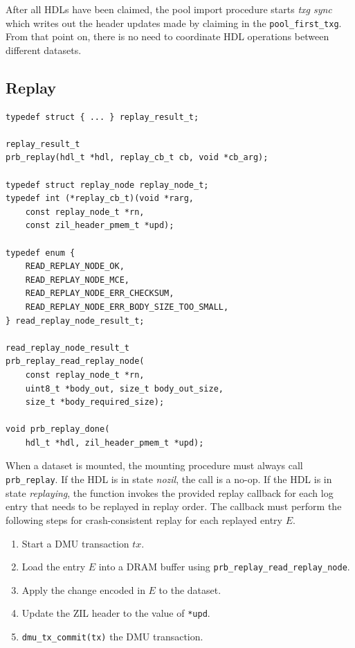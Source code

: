 \documentclass[12pt,a4paper,twoside]{book}
\begin{document}
{After all HDLs have been claimed, the pool import procedure starts \textit{txg sync} which writes out the header updates made by claiming in the \lstinline{pool_first_txg}.
From that point on, there is no need to coordinate HDL operations between different datasets.


\subsection{Replay}\label{di:prb:api:replay}

\begin{lstlisting}
typedef struct { ... } replay_result_t;

replay_result_t
prb_replay(hdl_t *hdl, replay_cb_t cb, void *cb_arg);

typedef struct replay_node replay_node_t;
typedef int (*replay_cb_t)(void *rarg,
    const replay_node_t *rn,
    const zil_header_pmem_t *upd);

typedef enum {
	READ_REPLAY_NODE_OK,
	READ_REPLAY_NODE_MCE,
	READ_REPLAY_NODE_ERR_CHECKSUM,
	READ_REPLAY_NODE_ERR_BODY_SIZE_TOO_SMALL,
} read_replay_node_result_t;

read_replay_node_result_t
prb_replay_read_replay_node(
    const replay_node_t *rn,
    uint8_t *body_out, size_t body_out_size,
    size_t *body_required_size);

void prb_replay_done(
    hdl_t *hdl, zil_header_pmem_t *upd);

\end{lstlisting}

When a dataset is mounted, the mounting procedure must always call \lstinline{prb_replay}.
If the HDL is in state \textit{nozil}, the call is a no-op.
If the HDL is in state \textit{replaying}, the function invokes the provided replay callback for each log entry that needs to be replayed in replay order.
The callback must perform the following steps for crash-consistent replay for each replayed entry $E$.
\begin{enumerate}[noitemsep]
    \item Start a DMU transaction $tx$.
    \item Load the entry $E$ into a DRAM buffer using \lstinline{prb_replay_read_replay_node}.
    \item Apply the change encoded in $E$ to the dataset.
    \item Update the ZIL header to the value of \lstinline{*upd}.
    \item \lstinline{dmu_tx_commit(tx)} the DMU transaction.
\end{enumerate}

}
\end{document}
